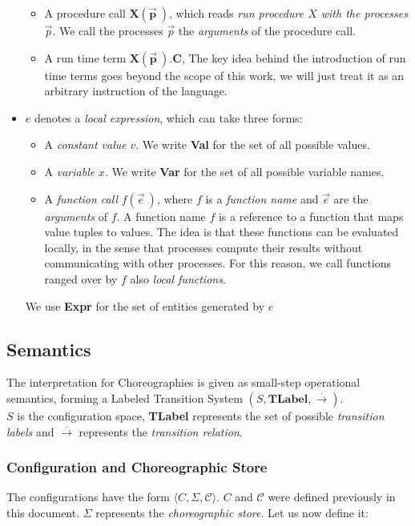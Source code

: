 \documentclass[12pt,a4paper,twoside]{book}
\begin{document}
\begin{itemize}
\begin{itemize}
	\item A procedure call $\bm{X(\vec{p}~)}$, which reads \textit{run procedure $X$ with the processes $\vec{p}$}. We call the processes $\vec{p}$ the \textit{arguments} of the procedure call.
	\item A run time term $\bm{X(\vec{p}~).C}$, The key idea behind the introduction of run time terms goes beyond the scope of this work, we will just treat it as an arbitrary instruction of the language.
\end{itemize}
\item $e$ denotes a \textit{local expression}, which can take three forms:
\begin{itemize}
	\item A \emph{constant value} $v$. We write \textbf{Val} for the set of all possible values.
	\item A \emph{variable} $x$. We write \textbf{Var} for the set of all possible variable names.
	\item A \emph{function call} $f(\vec{e}~)$, where $f$ is a \emph{function name} and $\vec{e}$ are the \emph{arguments} of $f$.
A function name $f$ is a reference to a function that maps value tuples to values. The idea is that these functions can be evaluated locally, in the sense that processes compute their results without communicating with other processes. For this reason, we call functions ranged over by $f$ also \emph{local functions}.
\end{itemize} 
We use \textbf{Expr} for the set of entities generated by $e$
\end{itemize}

\subsection{Semantics}
The interpretation for Choreographies is given as small-step operational semantics\cite{plotkin2004origins}, forming a Labeled Transition System $(S,\textbf{TLabel},\xrightarrow{.})$.\\
$S$ is the configuration space, \textbf{TLabel} represents the set of possible \textit{transition labels} and $\xrightarrow{.}$ represents the \textit{transition relation}.
\subsubsection{Configuration and Choreographic Store}
The configurations have the form $\langle C, \Sigma, \mathscr{C} \rangle$.
$C$ and $\mathscr{C}$ were defined previously in this document.
$\Sigma$ represents the \textit{choreographic store}. Let us now define it:
\end{document}
